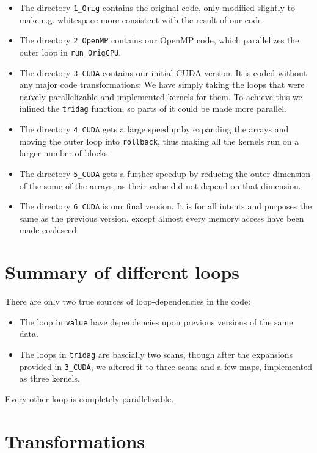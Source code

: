 \documentclass[]{report}
\begin{document}
\begin{itemize}
\item The directory \texttt{1\_Orig} contains the original code, only
  modified slightly to make e.g. whitespace more consistent with the
  result of our code.
\item The directory \texttt{2\_OpenMP} contains our OpenMP code, which
  parallelizes the outer loop in \texttt{run\_OrigCPU}.
\item The directory \texttt{3\_CUDA} contains our initial CUDA
  version. It is coded without any major code transformations: We have
  simply taking the loops that were naïvely parallelizable and
  implemented kernels for them. To achieve this we inlined the
  \texttt{tridag} function, so parts of it could be made more parallel.
\item The directory \texttt{4\_CUDA} gets a large speedup by expanding
  the arrays and moving the outer loop into \texttt{rollback}, thus
  making all the kernels run on a larger number of blocks.
\item The directory \texttt{5\_CUDA} gets a further speedup by reducing
  the outer-dimension of the some of the arrays, as their value did not
  depend on that dimension.
\item The directory \texttt{6\_CUDA} is our final version. It is for
  all intents and purposes the same as the previous version, except
  almost every memory access have been made coalesced.
\end{itemize}

\chapter{Summary of different loops}
There are only two true sources of loop-dependencies in the code:

\begin{itemize}
  \item The loop in \texttt{value} have dependencies upon previous
    versions of the same data.
  \item The loops in \texttt{tridag} are bascially two scans, though
    after the expansions provided in \texttt{3\_CUDA}, we altered it
    to three scans and a few maps, implemented as three kernels.
\end{itemize}

Every other loop is completely parallelizable.

\chapter{Transformations}





\end{document}
